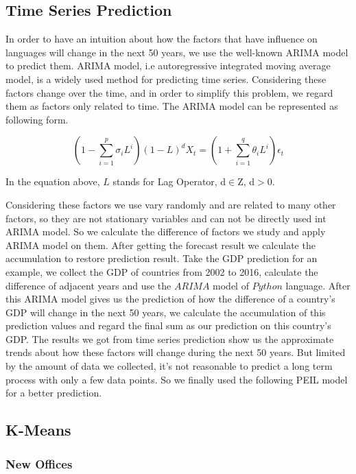 \documentclass{mcmthesis}
\begin{document}
  \subsection{Time Series Prediction}
  \indent \indent In order to have an intuition about how the factors that have influence on languages will change in the next 50 years, we use the well-known ARIMA model to predict them. ARIMA model, i.e autoregressive integrated moving average model, is a widely used method for predicting time series. Considering these factors change over the time, and in order to simplify this problem, we regard them as factors only related to time. The ARIMA model can be represented as following form.

  \begin{equation}
    \left(1-\sum^p_{i=1}\sigma_i L^i\right)(1-L)^d X_t = \left(1+\sum^q_{i=1}\theta_i L^i\right)\epsilon_t
  \end{equation}

  \indent In the equation above, $L$ stands for Lag Operator, d$\in$Z, d$>$0.

  \indent Considering these factors we use vary randomly and are related to many other factors, so they are not stationary variables and can not be directly used int ARIMA model. So we calculate the difference of factors we study and apply ARIMA model on them. After getting the forecast result we calculate the accumulation to restore prediction result. Take the GDP prediction for an example, we collect the GDP of countries from 2002 to 2016, calculate the difference of adjacent years and use the $ARIMA$ model of $Python$ language. After this ARIMA model gives us the prediction of how the difference of a country's GDP will change in the next 50 years, we calculate the accumulation of this prediction values and regard the final sum as our prediction on this country's GDP.
  \indent The results we got from time series prediction show us the approximate trends about how these factors will change during the next 50 years. But limited by the amount of data we collected, it's not reasonable to predict a long term process with only a few data points. So we finally used the following PEIL model for a better prediction.

  \subsection{K-Means}

  \subsubsection{New Offices}
\end{document}
